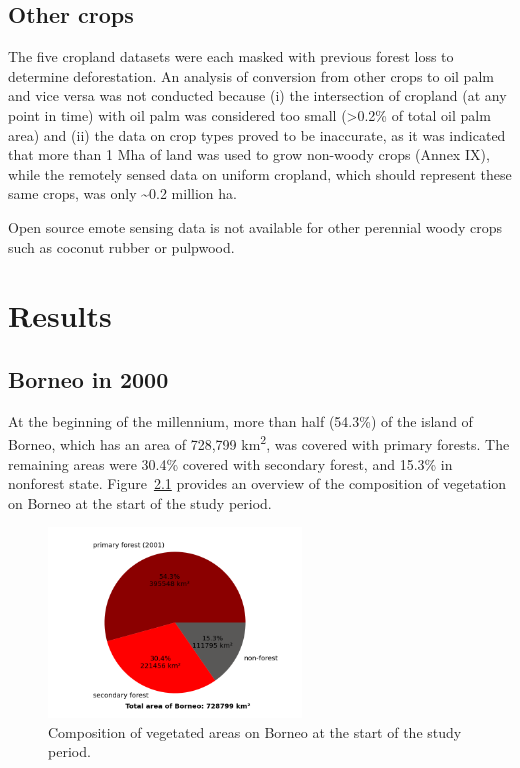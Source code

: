 \documentclass[
  letterpaper,
  DIV=11,
  numbers=noendperiod]{scrreprt}
\begin{document}
\hypertarget{other-crops-1}{%
\section{Other crops}\label{other-crops-1}}

The five cropland datasets were each masked with previous forest loss to
determine deforestation. An analysis of conversion from other crops to
oil palm and vice versa was not conducted because (i) the intersection
of cropland (at any point in time) with oil palm was considered too
small (\textgreater0.2\% of total oil palm area) and (ii) the data on
crop types proved to be inaccurate, as it was indicated that more than 1
Mha of land was used to grow non-woody crops (Annex IX), while the
remotely sensed data on uniform cropland, which should represent these
same crops, was only \textasciitilde0.2 million ha.

Open source emote sensing data is not available for other perennial
woody crops such as coconut rubber or pulpwood.


\hypertarget{results}{%
\chapter{Results}\label{results}}

\hypertarget{borneo-in-2000}{%
\section{Borneo in 2000}\label{borneo-in-2000}}

At the beginning of the millennium, more than half (54.3\%) of the
island of Borneo, which has an area of 728,799 km\textsuperscript{2},
was covered with primary forests. The remaining areas were 30.4\%
covered with secondary forest, and 15.3\% in nonforest state.
Figure~\ref{fig-piefcover2000} provides an overview of the composition
of vegetation on Borneo at the start of the study period.

\begin{figure}

{\centering \includegraphics[width=0.6\textwidth,height=\textheight]{text/../code/results/final_plots/fcover_2000.png}

}

\caption{\label{fig-piefcover2000}Composition of vegetated areas on
Borneo at the start of the study period.}

\end{figure}
\end{document}
